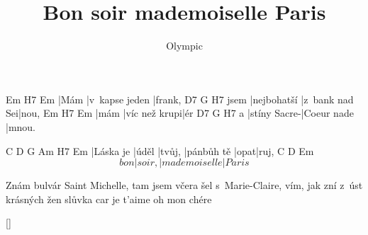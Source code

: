 \documentclass{song}
\title{Bon soir mademoiselle Paris}
\author{Olympic}
\begin{document}
\strophe
Em   H7             Em
|Mám |v~kapse jeden |frank,
     D7          G              H7
jsem |nejbohatší |z~bank nad Sei|nou,
Em   H7            Em
|mám |víc než krupi|ér
  D7           G           H7
a |stíny Sacre-|Coeur nade |mnou.
\endstrophe

C         D     G      Am         H7   Em
|Láska je |úděl |tvůj, |pánbůh tě |opat|ruj,
       C      D             Em
\[ bon |soir, |mademoiselle |Paris \]
\endstrophe

\strophe*
Znám bulvár Saint Michelle,
tam jsem včera šel s~Marie-Claire,
vím, jak zní z~úst krásných žen
slůvka car je t'aime oh mon chére
\endstrophe

\ref{}
\end{document}
